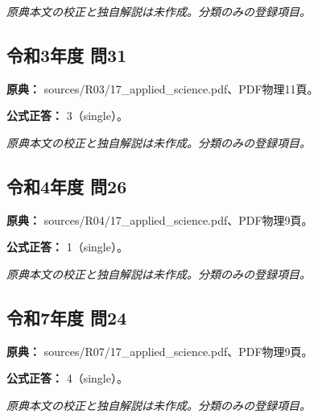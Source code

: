 \par\textit{原典本文の校正と独自解説は未作成。分類のみの登録項目。}

\subsection{令和3年度 問31}
\label{q:r03-reg-applied-31}

\noindent\textbf{原典：} sources/R03/17\_applied\_science.pdf、PDF物理11頁。

\textbf{公式正答：} 3（single）。

\par\textit{原典本文の校正と独自解説は未作成。分類のみの登録項目。}

\subsection{令和4年度 問26}
\label{q:r04-reg-applied-26}

\noindent\textbf{原典：} sources/R04/17\_applied\_science.pdf、PDF物理9頁。

\textbf{公式正答：} 1（single）。

\par\textit{原典本文の校正と独自解説は未作成。分類のみの登録項目。}

\subsection{令和7年度 問24}
\label{q:r07-reg-applied-24}

\noindent\textbf{原典：} sources/R07/17\_applied\_science.pdf、PDF物理9頁。

\textbf{公式正答：} 4（single）。

\par\textit{原典本文の校正と独自解説は未作成。分類のみの登録項目。}
